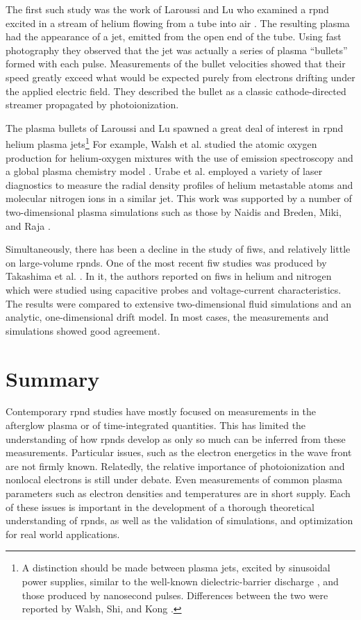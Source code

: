 The first such study was the work of Laroussi and Lu who examined a \acs{rpnd}
excited in a stream of helium flowing from a tube into air \cite{Laroussi2005,
Lu2006}. The resulting plasma had the appearance of a jet, emitted from the open
end of the tube. Using fast photography they observed that the jet was actually
a series of plasma ``bullets'' formed with each pulse. Measurements of the
bullet velocities showed that their speed greatly exceed what would be expected
purely from electrons drifting under the applied electric field. They described
the bullet as a classic cathode-directed streamer propagated by photoionization.

The plasma bullets of Laroussi and Lu spawned a great deal of interest in
\acs{rpnd} helium plasma jets\footnote{A distinction should be made between
plasma jets, excited by sinusoidal power supplies, similar to the well-known
dielectric-barrier discharge \cite{Kogelschatz2003}, and those produced by
nanosecond pulses. Differences between the two were reported by Walsh, Shi, and
Kong \cite{Walsh2006}.} For example, Walsh et al. studied the atomic oxygen
production for helium-oxygen mixtures with the use of emission spectroscopy and
a global plasma chemistry model \cite{Walsh2010}. Urabe et al. employed a
variety of laser diagnostics to measure the radial density profiles of helium
metastable atoms and molecular nitrogen ions in a similar jet. This work was
supported by a number of two-dimensional plasma simulations such as those by
Naidis \cite{Naidis2010} and Breden, Miki, and Raja \cite{Breden2011}.

Simultaneously, there has been a decline in the study of \acs{fiw}s, and
relatively little on large-volume \acs{rpnd}s. One of the most recent \acs{fiw}
studies was produced by Takashima et al. \cite{Takashima2011}. In it, the
authors reported on \acs{fiw}s in helium and nitrogen which were studied using
capacitive probes and voltage-current characteristics. The results were compared
to extensive two-dimensional fluid simulations and an analytic, one-dimensional
drift model. In most cases, the measurements and simulations showed good
agreement.

\section{Summary}

Contemporary \acs{rpnd} studies have mostly focused on measurements in the
afterglow plasma or of time-integrated quantities. This has limited the
understanding of how \acs{rpnd}s develop as only so much can be inferred from
these measurements. Particular issues, such as the electron energetics in the
wave front are not firmly known. Relatedly, the relative importance of
photoionization and nonlocal electrons is still under debate. Even measurements
of common plasma parameters such as electron densities and temperatures are in
short supply. Each of these issues is important in the development of a thorough
theoretical understanding of \acs{rpnd}s, as well as the validation of
simulations, and optimization for real world applications.

